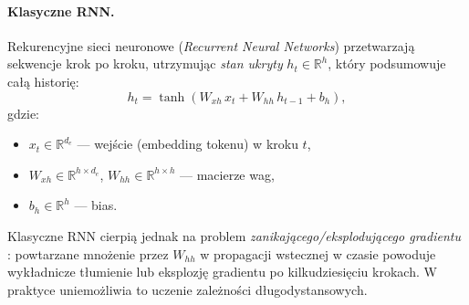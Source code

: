 \documentclass[12pt,a4paper]{article}
\begin{document}
\paragraph{Klasyczne RNN.}
Rekurencyjne sieci neuronowe (\textit{Recurrent Neural Networks}) \citep{goodfellow2016dl} przetwarzają sekwencje krok po kroku, utrzymując \emph{stan ukryty} $h_t \in \mathbb{R}^{h}$, który podsumowuje całą historię:
\begin{equation}
h_t = \tanh\!\left(W_{xh}\, x_t + W_{hh}\, h_{t-1} + b_h \right),
\end{equation}
gdzie:
\begin{itemize}[leftmargin=1.5em]
    \item $x_t \in \mathbb{R}^{d_e}$ --- wejście (embedding tokenu) w kroku $t$,
    \item $W_{xh} \in \mathbb{R}^{h \times d_e}$, $W_{hh} \in \mathbb{R}^{h \times h}$ --- macierze wag,
    \item $b_h \in \mathbb{R}^{h}$ --- bias.
\end{itemize}
Klasyczne RNN cierpią jednak na problem \emph{zanikającego/eksplodującego gradientu} \citep{pascanu2013difficulty}: powtarzane mnożenie przez $W_{hh}$ w propagacji wstecznej w czasie powoduje wykładnicze tłumienie lub eksplozję gradientu po kilkudziesięciu krokach. W praktyce uniemożliwia to uczenie zależności długodystansowych.
\end{document}
